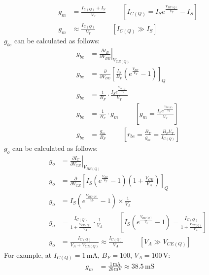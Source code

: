 \begin{itemize}
\begin{itemize}
\begin{align*}
          g_m &= \frac{I_{C(Q)} + I_S}{V_T} \hspace{1cm} \left[I_{C(Q)} = I_S e^{\frac{V_{BE(Q)}}{V_T}} - I_S\right] \\
          g_m &\approx \frac{I_{C(Q)}}{V_T} \hspace{1cm} [I_{C(Q)} \gg I_S]
        \end{align*}
        \(g_{be}\) can be calculated as follows:
        \begin{align*}
          g_{be} &= \left.\frac{\partial I_B}{\partial V_{BE}} \right|_{V_{CE(Q)}} \\
          g_{be} &= \frac{\partial}{\partial V_{BE}} \left[ \frac{I_S}{B_F} \left( e^{\frac{V_{BE}}{V_T}} - 1 \right) \right]_{Q} \\
          g_{be} &= \frac{1}{B_F} \cdot \frac{I_S e^{\frac{V_{BE(Q)}}{V_T}}}{V_T} \\
          g_{be} &= \frac{1}{B_F} \cdot g_m \hspace{1cm} \left[g_m = \frac{I_S e^{\frac{V_{BE(Q)}}{V_T}}}{V_T}\right] \\
          g_{be} &= \frac{g_m}{B_F} \hspace{1cm} \left[r_{be} = \frac{B_F}{g_m} = \frac{B_F V_T}{I_{C(Q)}}\right]
        \end{align*}
        \(g_o\) can be calculated as follows:
        \begin{align*}
          g_o &= \left.\frac{\partial I_C}{\partial V_{CE}} \right|_{V_{BE(Q)}} \\
          g_o &= \frac{\partial}{\partial V_{CE}} \left[ I_S \left( e^{\frac{V_{BE}}{V_T}} - 1 \right) \left( 1 + \frac{V_{CE}}{V_A} \right) \right]_{Q} \\
          g_o &= I_S \left(e^{\frac{V_{BE(Q)}}{V_T}} - 1 \right) \times \frac{1}{V_A} \\
          g_o &= \frac{I_{C(Q)}}{1 + \frac{V_{CE(Q)}}{V_A}} \cdot \frac{1}{V_A} \hspace{1cm} \left[I_S \left(e^{\frac{V_{BE(Q)}}{V_T}} - 1 \right) = \frac{I_{C(Q)}}{1 + \frac{V_{CE(Q)}}{V_A}}\right] \\
          g_o &= \frac{I_{C(Q)}}{V_A + V_{CE(Q)}} \approx \frac{I_{C(Q)}}{V_A} \hspace{1cm} [V_A \gg V_{CE(Q)}]
        \end{align*}
        For example, at \(I_{C(Q)} = 1\,\text{mA}\), \(B_F = 100\), \(V_A = 100\,\text{V}\):
        \begin{align*}
          g_m &= \frac{1\,\text{mA}}{26\,\text{mV}} \approx 38.5\,\text{mS} \hspace{1cm}

\end{align*}
\end{itemize}
\end{itemize}
